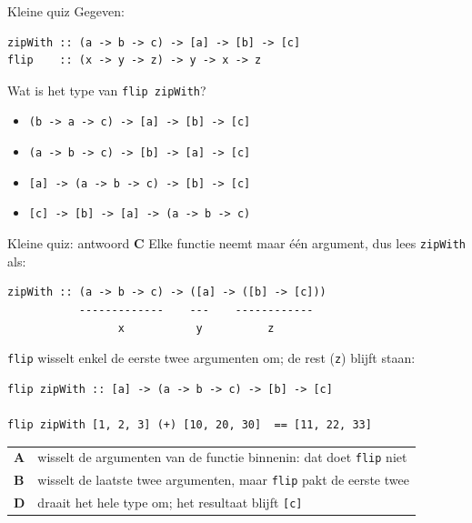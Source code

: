 \documentclass[aspectratio=169,11pt]{beamer}
\newcommand{\hs}{\lstinline[style=hsinline]}
\begin{document}
\begin{frame}[fragile]{Kleine quiz}
  Gegeven:
\begin{lstlisting}
zipWith :: (a -> b -> c) -> [a] -> [b] -> [c]
flip    :: (x -> y -> z) -> y -> x -> z
\end{lstlisting}
  Wat is het type van \hs|flip zipWith|?

  \bigskip
  \begin{itemize}
    \item[\textbf{A}] \hs|(b -> a -> c) -> [a] -> [b] -> [c]|
    \medskip
    \item[\textbf{B}] \hs|(a -> b -> c) -> [b] -> [a] -> [c]|
    \medskip
    \item[\textbf{C}] \hs|[a] -> (a -> b -> c) -> [b] -> [c]|
    \medskip
    \item[\textbf{D}] \hs|[c] -> [b] -> [a] -> (a -> b -> c)|
  \end{itemize}
\end{frame}

\begin{frame}[fragile]{Kleine quiz: antwoord \textbf{C}}
  Elke functie neemt maar \alert{één} argument, dus lees \hs|zipWith| als:
\begin{lstlisting}
zipWith :: (a -> b -> c) -> ([a] -> ([b] -> [c]))
           -------------    ---    ------------
                 x           y          z
\end{lstlisting}
  \hs|flip| wisselt \alert{enkel de eerste twee} argumenten om; de rest (\hs|z|) blijft staan:
\begin{lstlisting}
flip zipWith :: [a] -> (a -> b -> c) -> [b] -> [c]

flip zipWith [1, 2, 3] (+) [10, 20, 30]  == [11, 22, 33]
\end{lstlisting}
  \pause
  \small
  \begin{tabular}{@{}l l@{}}
    \textbf{A} & wisselt de argumenten van de functie \alert{binnenin}: dat doet \hs|flip| niet \\
    \textbf{B} & wisselt de \alert{laatste} twee argumenten, maar \hs|flip| pakt de eerste twee \\
    \textbf{D} & draait het \alert{hele} type om; het resultaat blijft \hs|[c]| \\
  \end{tabular}
\end{frame}
\end{document}

